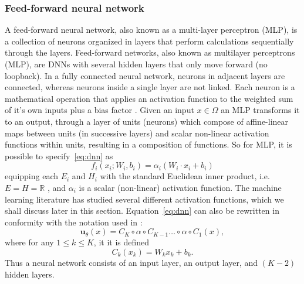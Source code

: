 \documentclass[pdflatex,sn-basic]{sn-jnl}%
\theoremstyle{thmstyleone}%
\theoremstyle{thmstyletwo}%
\theoremstyle{thmstylethree}%
\begin{document}
\subsubsection{Feed-forward neural network}
A feed-forward neural network, also known as a multi-layer perceptron (MLP), is a collection of neurons organized in layers that perform calculations sequentially through the layers. %
Feed-forward networks, also known as multilayer perceptrons (MLP), are DNNs with several hidden layers that only move forward (no loopback). 
In a fully connected neural network, neurons in adjacent layers are connected, whereas neurons inside a single layer are not linked. Each neuron is a mathematical operation that applies an activation function to the weighted sum of it's own inputs plus a bias factor \citep{Wah2021_PinneikEikonalSolution_HagWHA}.
Given an input $x \in \Omega$ an MLP transforms it to an output, through a layer of units (neurons) which compose of affine-linear maps between units (in successive layers) and scalar non-linear activation functions within units, resulting in a composition of functions.
So for MLP, it is possible to specify~\eqref{eq:dnn}  as
$$
f_i (x_i ; W_i, b_i) = \alpha_i (W_i \cdot x_i + b_i)
$$
equipping each $E_i$ and $H_i$ with the standard Euclidean inner product, i.e. $E=H=\mathbb{R}$ \citep{Cat2018_SpecificNetworkDescriptions_ChaCC}, and $\alpha_i$ is a scalar (non-linear) activation function.  The machine learning literature has studied several different activation functions, which we shall discuss later in this section.
%
Equation~\eqref{eq:dnn} can also be rewritten in conformity with the notation used in \cite{Mis2021_EstimatesGeneralizationError_MolMM}:
\begin{equation}
\label{eq:ann}
\bm{u}_{\theta}(x) = C_K \circ\alpha \circ C_{K-1}  \ldots  \circ \alpha \circ C_1(x),
\end{equation} 
%
where for any $1 \leq k \leq K$, it it is defined
\begin{equation}
\label{eq:C}
C_k (x_k) = W_k x_k + b_k.
\end{equation}
Thus a neural network consists of an input layer, an output layer, and $(K-2)$ hidden layers.
\end{document}
